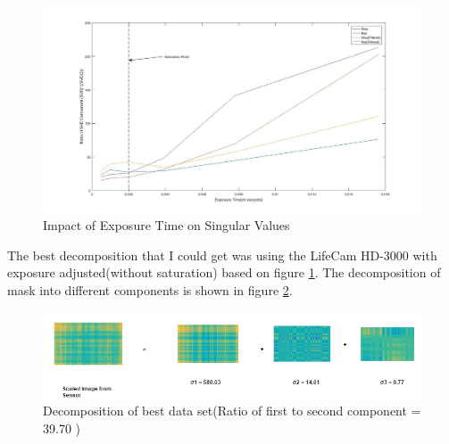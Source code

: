 \begin{figure}[h]
\centering
\includegraphics[width = \linewidth]{pics/slm/svd_graph_exposure.jpg}
\caption{Impact of Exposure Time on Singular Values}
\label{fig:svd_exposure}
\end{figure}
The best decomposition that I could get was using the LifeCam HD-3000 with exposure adjusted(without saturation) based on figure \ref{fig:svd_exposure}. The decomposition of mask into different components is shown in figure \ref{fig:svd_dec_exp}. 
\begin{figure}[ht]
\centering
\includegraphics[width = \linewidth]{pics/slm/svd-decomp-exp.png}
\caption{Decomposition of best data set(Ratio of first to second component = 39.70 )}
\label{fig:svd_dec_exp}
\end{figure}